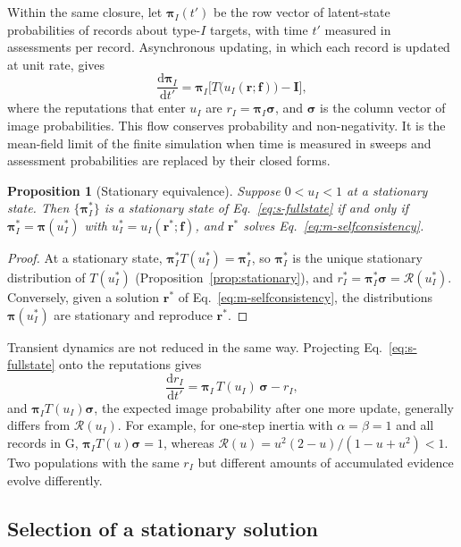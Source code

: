 \documentclass[10pt]{wlscirep}
\newcommand{\Rmap}{\mathscr{R}}            %
\newcommand{\dd}{\mathrm{d}}
\theoremstyle{plain}
\newtheorem{proposition}[lemma]{Proposition}
\theoremstyle{remark}
\begin{document}
Within the same closure, let $\bm\pi_I(t')$ be the row vector of latent-state probabilities of records about type-$I$ targets, with time $t'$ measured in assessments per record. Asynchronous updating, in which each record is updated at unit rate, gives
\begin{equation}
\frac{\dd\bm\pi_I}{\dd t'}=\bm\pi_I\bigl[T\bigl(u_I(\bm r;\bm f)\bigr)-\mathbf I\bigr],
\label{eq:s-fullstate}
\end{equation}
where the reputations that enter $u_I$ are $r_I=\bm\pi_I\bm\sigma$, and $\bm\sigma$ is the column vector of image probabilities. This flow conserves probability and non-negativity. It is the mean-field limit of the finite simulation when time is measured in sweeps and assessment probabilities are replaced by their closed forms.

\begin{proposition}[Stationary equivalence]\label{prop:equivalence}
Suppose $0<u_I<1$ at a stationary state. Then $\{\bm\pi^*_I\}$ is a stationary state of Eq.~\eqref{eq:s-fullstate} if and only if $\bm\pi^*_I=\bm\pi(u^*_I)$ with $u^*_I=u_I(\bm r^*;\bm f)$, and $\bm r^*$ solves Eq.~\eqref{eq:m-selfconsistency}.
\end{proposition}
\begin{proof}
At a stationary state, $\bm\pi^*_IT(u^*_I)=\bm\pi^*_I$, so $\bm\pi^*_I$ is the unique stationary distribution of $T(u^*_I)$ (Proposition~\ref{prop:stationary}), and $r^*_I=\bm\pi^*_I\bm\sigma=\Rmap(u^*_I)$. Conversely, given a solution $\bm r^*$ of Eq.~\eqref{eq:m-selfconsistency}, the distributions $\bm\pi(u^*_I)$ are stationary and reproduce $\bm r^*$.
\end{proof}

Transient dynamics are not reduced in the same way. Projecting Eq.~\eqref{eq:s-fullstate} onto the reputations gives
\begin{equation}
\frac{\dd r_I}{\dd t'}=\bm\pi_I\,T(u_I)\,\bm\sigma-r_I,
\label{eq:s-projection}
\end{equation}
and $\bm\pi_IT(u_I)\bm\sigma$, the expected image probability after one more update, generally differs from $\Rmap(u_I)$. For example, for one-step inertia with $\alpha=\beta=1$ and all records in G, $\bm\pi_IT(u)\bm\sigma=1$, whereas $\Rmap(u)=u^2(2-u)/(1-u+u^2)<1$. Two populations with the same $r_I$ but different amounts of accumulated evidence evolve differently.

\subsection{Selection of a stationary solution}
\end{document}
